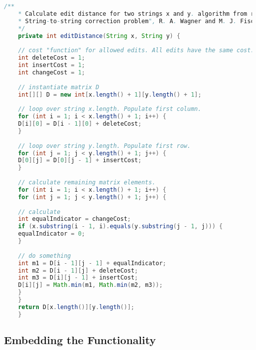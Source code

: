 \begin{lstlisting}[language=Java, caption=This is a code example., label=lst:2-gram]
	/**
	* Calculate edit distance for two strings x and y. algorithm from reference: "The
	* String-to-string correction problem", R. A. Wagner and M. J. Fischer
	*/
	private int editDistance(String x, String y) {
	
	// cost "function" for allowed edits. All edits have the same cost.
	int deleteCost = 1;
	int insertCost = 1;
	int changeCost = 1;
	
	// instantiate matrix D
	int[][] D = new int[x.length() + 1][y.length() + 1];
	
	// loop over string x.length. Populate first column.
	for (int i = 1; i < x.length() + 1; i++) {
	D[i][0] = D[i - 1][0] + deleteCost;
	}
	
	// loop over string y.length. Populate first row.
	for (int j = 1; j < y.length() + 1; j++) {
	D[0][j] = D[0][j - 1] + insertCost;
	}
	
	// calculate remaining matrix elements.
	for (int i = 1; i < x.length() + 1; i++) {
	for (int j = 1; j < y.length() + 1; j++) {
	
	// calculate
	int equalIndicator = changeCost;
	if (x.substring(i - 1, i).equals(y.substring(j - 1, j))) {
	equalIndicator = 0;
	}
	
	// do something
	int m1 = D[i - 1][j - 1] + equalIndicator;
	int m2 = D[i - 1][j] + deleteCost;
	int m3 = D[i][j - 1] + insertCost;
	D[i][j] = Math.min(m1, Math.min(m2, m3));
	}
	}
	return D[x.length()][y.length()];
	}
\end{lstlisting}



\subsection{Embedding the Functionality}



